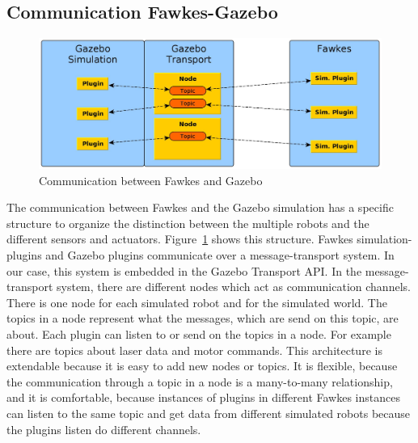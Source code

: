 \subsection{Communication Fawkes-Gazebo}
\label{sec:architecture_communication}
\begin{figure}
\includegraphics[width=\textwidth]{tabs/communication}
\caption{Communication between Fawkes and Gazebo}
\label{fig:communication}
\end{figure}
The communication between Fawkes and the Gazebo simulation has a specific structure to organize the distinction between the multiple robots and the different sensors and actuators. Figure~\ref{fig:communication} shows this structure. Fawkes simulation-plugins and Gazebo plugins communicate over a message-transport system. In our case, this system is embedded in the Gazebo Transport API. In the message-transport system, there are different nodes which act as communication channels. There is one node for each simulated robot and for the simulated world. The topics in a node represent what the messages, which are send on this topic, are about. Each plugin can listen to or send on the topics in a node. For example there are topics about laser data and motor commands. This architecture is extendable because it is easy to add new nodes or topics. It is flexible, because the communication through a topic in a node is a many-to-many relationship, and it is comfortable, because instances of plugins in different Fawkes instances can listen to the same topic and get data from different simulated robots because the plugins listen do different channels.


